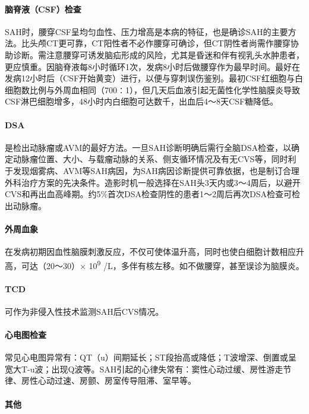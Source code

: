 \paragraph{脑脊液（CSF）检查}

SAH时，腰穿CSF呈均匀血性、压力增高是本病的特征，也是确诊SAH的主要方法。比头颅CT更可靠，CT阳性者不必作腰穿可确诊，但CT阴性者尚需作腰穿协助诊断。需注意腰穿可诱发脑疝形成的风险，尤其是昏迷和伴有视乳头水肿患者，更应慎重。因脑脊液每8小时循环1次，发病8小时后做腰穿作为最早时间。最好在发病12小时后（CSF开始黄变）进行，以便与穿刺误伤鉴别。最初CSF红细胞与白细胞数比例与外周血相同（700∶1），但几天后血液引起无菌性化学性脑膜炎导致CSF淋巴细胞增多，48小时内白细胞可达数千，出血后4～8天CSF糖降低。

\paragraph{DSA}

是检出动脉瘤或AVM的最好方法。一旦SAH诊断明确后需行全脑DSA检查，以确定动脉瘤位置、大小、与载瘤动脉的关系、侧支循环情况及有无CVS等，同时利于发现烟雾病、AVM等SAH病因，为SAH病因诊断提供可靠依据，也是制订合理外科治疗方案的先决条件。造影时机一般选择在SAH头3天内或3～4周后，以避开CVS和再出血高峰期。约5\%首次DSA检查阴性的患者1～2周后再次DSA检查可检出动脉瘤。

\paragraph{外周血象}

在发病初期因血性脑膜刺激反应，不仅可使体温升高，同时也使白细胞计数相应升高，可达（20～30）×
10\textsuperscript{9} /L，多伴有核左移。如不做腰穿，甚至误诊为脑膜炎。

\paragraph{TCD}

可作为非侵入性技术监测SAH后CVS情况。

\paragraph{心电图检查}

常见心电图异常有：QT（u）间期延长；ST段抬高或降低；T波增深、倒置或呈宽大T-u波；出现Q波等。SAH引起的心律失常有：窦性心动过缓、房性游走节律、房性心动过速、房颤、房室传导阻滞、室早等。

\paragraph{其他}

